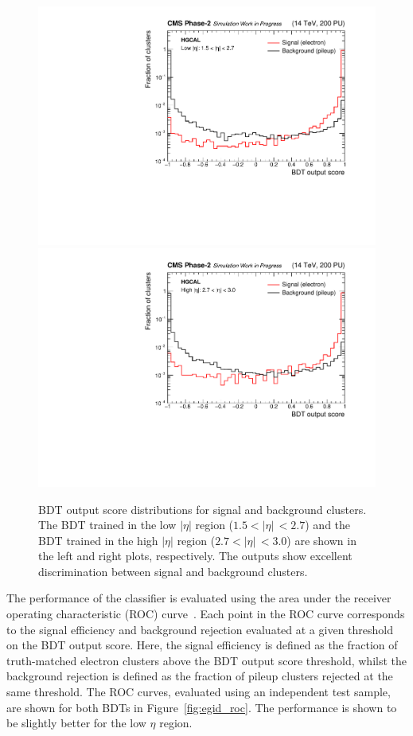 \begin{figure}[htb!]
  \centering
  \includegraphics[width=.49\textwidth]{Figures/cms/egid/cl3d_bdt_electron_200PU_vs_neutrino_200PU_full_lo.pdf}
  \includegraphics[width=.49\textwidth]{Figures/cms/egid/cl3d_bdt_electron_200PU_vs_neutrino_200PU_full_hi.pdf}
  \caption[$e/\gamma$ identification output score distributions]
  {
    BDT output score distributions for signal and background clusters. The BDT trained in the low $|\eta|$ region ($1.5<|\eta|\,<2.7$) and the BDT trained in the high $|\eta|$ region ($2.7<|\eta|\,<3.0$) are shown in the left and right plots, respectively. The outputs show excellent discrimination between signal and background clusters.
  }
  \label{fig:egid_output}
\end{figure}

The performance of the classifier is evaluated using the area under the receiver operating characteristic (ROC) curve~\cite{roc}. Each point in the ROC curve corresponds to the signal efficiency and background rejection evaluated at a given threshold on the BDT output score. Here, the signal efficiency is defined as the fraction of truth-matched electron clusters above the BDT output score threshold, whilst the background rejection is defined as the fraction of pileup clusters rejected at the same threshold. The ROC curves, evaluated using an independent test sample, are shown for both BDTs in Figure~\ref{fig:egid_roc}. The performance is shown to be slightly better for the low $\eta$ region. 

